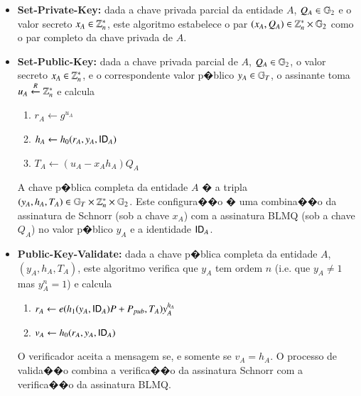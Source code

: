 \documentclass[a4paper,capchap,espacoduplo,normaltoc]{abntepusp}
\begin{document}
\begin{itemize}
\item \textbf{Set-Private-Key:} dada a chave privada parcial da entidade $A$, $Q_A \in \mathbb{G}_2$ e o valor secreto $x_A \in \mathbb{Z}_n^\ast$, este algoritmo estabelece o par $(x_A, Q_A) \in \mathbb{Z}_n^\ast \times \mathbb{G}_2$ como o par completo da chave privada de $A$.

\item \textbf{Set-Public-Key:} dada a chave privada parcial de $A$, $Q_A \in \mathbb{G}_2$, o valor secreto $x_A \in \mathbb{Z}_n^\ast$, e o correspondente valor p�blico $y_A \in \mathbb{G}_T$, o assinante toma $u_A \stackrel{R}{\gets} \mathbb{Z}_n^\ast$ e calcula
\begin{enumerate}
\item $r_A \gets g^{u_A}$
\item $h_A \gets h_0(r_A, y_A, \mathsf{ID}_A)$
\item $T_A \gets (u_A - x_A h_A) Q_A$
\end{enumerate}
A chave p�blica completa da entidade $A$ � a tripla $(y_A, h_A, T_A) \in \mathbb{G}_T \times \mathbb{Z}_n^\ast \times \mathbb{G}_2$. Este configura��o � uma combina��o da assinatura de Schnorr (sob a chave $x_A$) com a assinatura BLMQ (sob a chave $Q_A$) no valor p�blico $y_A$ e a identidade $\mathsf{ID}_A$. 

\item \textbf{Public-Key-Validate:} dada a chave p�blica completa da entidade $A$, $(y_A, h_A, T_A)$, este algoritmo verifica que $y_A$ tem ordem $n$ (i.e. que $y_A \neq 1$ mas $y_A^n = 1$) e calcula
\begin{enumerate}
\item $r_A \gets e(h_1(y_A, \mathsf{ID}_A)P + P_{pub}, T_A) y_A^{h_A}$
\item $v_A \gets h_0(r_A, y_A, \mathsf{ID}_A)$
\end{enumerate}
O verificador aceita a mensagem se, e somente se $v_A = h_A$. O processo de valida��o combina a verifica��o da assinatura Schnorr com a verifica��o da assinatura BLMQ.


\end{itemize}
\end{document}
